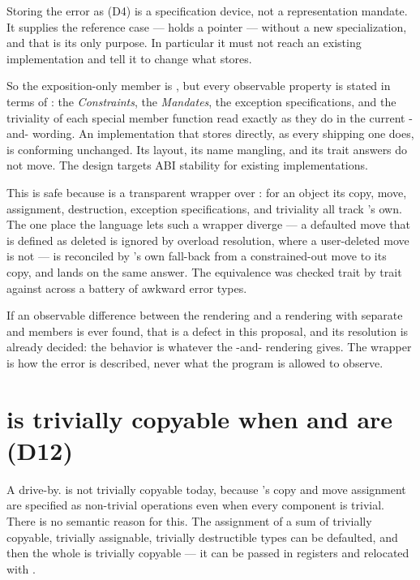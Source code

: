 \documentclass[a4paper,10pt,oneside,openany,final,article]{memoir}
\begin{document}
Storing the error as  (D4) is a specification device, not a
representation mandate. It supplies the reference case ---
 holds a pointer --- without a new specialization, and
that is its only purpose. In particular it must not reach an existing implementation and tell it to change
what  stores.

So the exposition-only member is , but every observable
property is stated in terms of : the \emph{Constraints}, the
\emph{Mandates}, the exception specifications, and the triviality of each special
member function read exactly as they do in the current -and-
wording. An implementation that stores  directly, as every shipping one
does, is conforming unchanged. Its layout, its name mangling, and its trait
answers do not move. The design targets ABI stability for existing
implementations.

This is safe because  is a transparent wrapper over
: for an object  its copy, move, assignment, destruction,
exception specifications, and triviality all track 's own. The one place
the language lets such a wrapper diverge --- a defaulted move that is defined as
deleted is ignored by overload resolution, where a user-deleted move is not ---
is reconciled by 's own fall-back from a constrained-out move to
its copy, and lands on the same answer. The equivalence was checked trait by
trait against  across a battery of awkward error types.

If an observable
difference between the  rendering and a rendering with
separate  and  members is ever found, that is a defect in this
proposal, and its resolution is already decided: the behavior is whatever the
-and- rendering gives. The wrapper is how the error is
described, never what the program is allowed to observe.

\section{ is trivially copyable when  and
   are (D12)}

A drive-by.  is not trivially copyable today, because
's copy and move assignment are specified as non-trivial
operations even when every component is trivial. There is no semantic reason for
this. The assignment of a sum of trivially copyable, trivially assignable,
trivially destructible types can be defaulted, and then the whole
 is trivially copyable --- it can be passed in registers and
relocated with .
\end{document}
